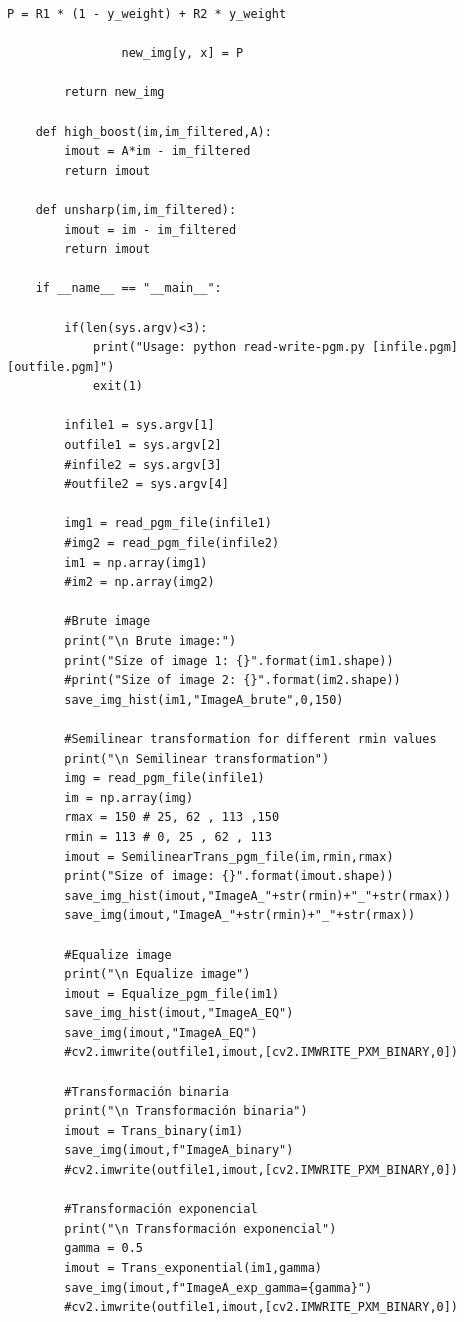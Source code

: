 \documentclass[11pt,twocolumn,twoside]{opticajnl}
\begin{document}
\begin{onecolumn}
\begin{lstlisting}[style=mystyle]
                P = R1 * (1 - y_weight) + R2 * y_weight
    
                new_img[y, x] = P
    
        return new_img
    
    def high_boost(im,im_filtered,A):
        imout = A*im - im_filtered
        return imout
    
    def unsharp(im,im_filtered):
        imout = im - im_filtered
        return imout
    
    if __name__ == "__main__":
        
        if(len(sys.argv)<3):
            print("Usage: python read-write-pgm.py [infile.pgm] [outfile.pgm]")
            exit(1)
    
        infile1 = sys.argv[1]
        outfile1 = sys.argv[2]
        #infile2 = sys.argv[3]
        #outfile2 = sys.argv[4]
        
        img1 = read_pgm_file(infile1)
        #img2 = read_pgm_file(infile2)
        im1 = np.array(img1)
        #im2 = np.array(img2)
        
        #Brute image 
        print("\n Brute image:")
        print("Size of image 1: {}".format(im1.shape))
        #print("Size of image 2: {}".format(im2.shape))
        save_img_hist(im1,"ImageA_brute",0,150)
    
        #Semilinear transformation for different rmin values
        print("\n Semilinear transformation")
        img = read_pgm_file(infile1)
        im = np.array(img)
        rmax = 150 # 25, 62 , 113 ,150
        rmin = 113 # 0, 25 , 62 , 113 
        imout = SemilinearTrans_pgm_file(im,rmin,rmax)
        print("Size of image: {}".format(imout.shape))
        save_img_hist(imout,"ImageA_"+str(rmin)+"_"+str(rmax))
        save_img(imout,"ImageA_"+str(rmin)+"_"+str(rmax))
    
        #Equalize image
        print("\n Equalize image")
        imout = Equalize_pgm_file(im1)
        save_img_hist(imout,"ImageA_EQ")    
        save_img(imout,"ImageA_EQ")    
        #cv2.imwrite(outfile1,imout,[cv2.IMWRITE_PXM_BINARY,0])
    
        #Transformación binaria
        print("\n Transformación binaria")
        imout = Trans_binary(im1)
        save_img(imout,f"ImageA_binary")
        #cv2.imwrite(outfile1,imout,[cv2.IMWRITE_PXM_BINARY,0])
    
        #Transformación exponencial
        print("\n Transformación exponencial")
        gamma = 0.5
        imout = Trans_exponential(im1,gamma)
        save_img(imout,f"ImageA_exp_gamma={gamma}")
        #cv2.imwrite(outfile1,imout,[cv2.IMWRITE_PXM_BINARY,0])
        

\end{lstlisting}
\end{onecolumn}
\end{document}
